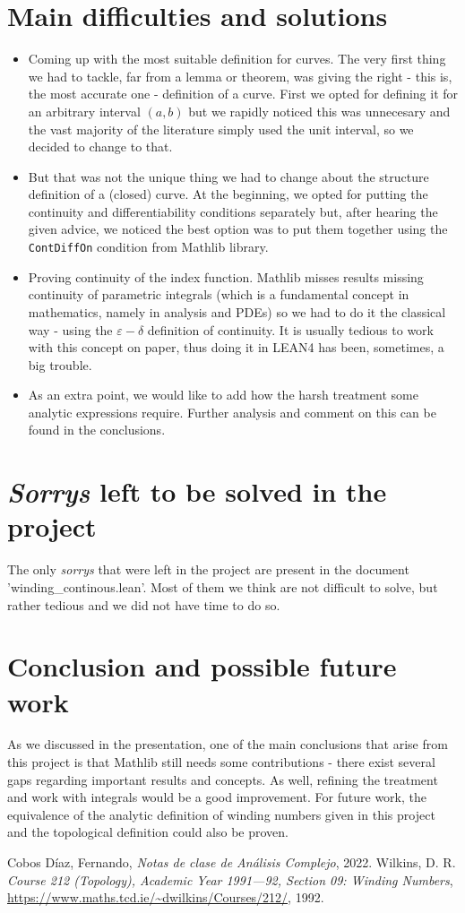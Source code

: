 \documentclass[a4paper,12pt]{article}
\begin{document}
\section{Main difficulties and solutions}
\begin{itemize}
  \item Coming up with the most suitable definition for curves. The very first thing we had to tackle, far from a lemma or theorem, was giving the right - this is, the
  most accurate one - definition of a curve. First we opted for defining it for an arbitrary interval $(a, b)$
  but we rapidly noticed this was unnecesary and the vast majority of the literature simply used the unit interval,
  so we decided to change to that.
  \item But that was not the unique thing we had to change about the structure definition of a (closed) curve. At the beginning, we opted
  for putting the continuity and differentiability conditions separately but, after hearing the given advice, we noticed
  the best option was to put them together using the \verb|ContDiffOn| condition from Mathlib library.
  \item Proving continuity of the index function. Mathlib misses results missing continuity of parametric
  integrals (which is a fundamental concept in mathematics, namely in analysis and PDEs) so we had to do it the classical
  way - using the $\varepsilon - \delta$ definition of continuity. It is usually tedious to work with this concept
  on paper, thus doing it in LEAN4 has been, sometimes, a big trouble.
  \item As an extra point, we would like to add how the harsh treatment some analytic expressions require. Further analysis and
  comment on this can be found in the conclusions.
\end{itemize}

\section{\textit{Sorrys} left to be solved in the project}
The only \textit{sorrys} that were left in the project are present in the document 'winding_continous.lean'. 
Most of them we think are not difficult to solve, but rather tedious and we did not have time to do so.
\section{Conclusion and possible future work}
As we discussed in the presentation, one of the main conclusions that arise from this project is that
Mathlib still needs some contributions - there exist several gaps regarding important results and concepts.
As well, refining the treatment and work with integrals would be a good improvement. For future work, the 
equivalence of the analytic definition of winding numbers given in this project and the topological definition
could also be proven.
\begin{thebibliography}{9}
 Cobos Díaz, Fernando, \textit{Notas de clase de Análisis Complejo}, 2022.
 Wilkins, D. R. \textit{Course 212 (Topology), Academic Year 1991—92, Section 09: Winding Numbers}, \url{https://www.maths.tcd.ie/~dwilkins/Courses/212/}, 1992.
\end{thebibliography}
\end{document}
